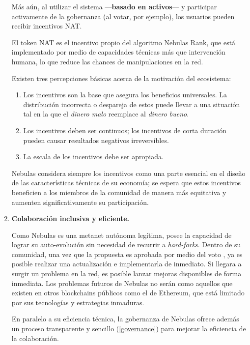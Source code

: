 \begin{enumerate}
	Más aún, al utilizar el sistema \nr —\textbf{basado en activos}— y participar activamente de la gobernanza \onchain (al votar, por ejemplo), los usuarios pueden recibir incentivos NAT.

	El token NAT es el incentivo propio del algoritmo Nebulas Rank, que está implementado por medio de capacidades técnicas más que intervención humana, lo que reduce las chances de manipulaciones en la red.

	Existen tres percepciones básicas acerca de la motivación del ecosistema:

	\begin{enumerate}
		\item Los incentivos son la base que asegura los beneficios universales. La distribución incorrecta o despareja de estos puede llevar a una situación tal en la que el \textit{dinero malo} reemplace al \textit{dinero bueno}.
		\item Los incentivos deben ser continuos; los incentivos de corta duración pueden causar resultados negativos irreversibles.
		\item La escala de los incentivos debe ser apropiada.
	\end{enumerate}

	Nebulas considera siempre los incentivos como una parte esencial en el diseño de las características técnicas de su economía; se espera que estos incentivos beneficien a los miembros de la comunidad de manera más equitativa y aumenten significativamente su participación.

	\item

	\textbf{Colaboración inclusiva y eficiente.}

	Como Nebulas es una metanet autónoma legítima, posee la capacidad de lograr su auto-evolución sin necesidad de recurrir a \textit{hard-forks}. Dentro de su comunidad, una vez que la propuesta es aprobada por medio del voto \onchain, ya es posible realizar una actualización e implementarla de inmediato. Si llegara a surgir un problema en la red, es posible lanzar mejoras disponibles de forma inmediata. Los problemas futuros de Nebulas no serán como aquellos que existen en otros blockchains públicos como el de Ethereum, que está limitado por sus tecnologías y estrategias inmaduras.

	En paralelo a su eficiencia técnica, la gobernanza de Nebulas ofrece además un proceso transparente y sencillo (\ref{governance}) para mejorar la eficiencia de la colaboración.

\end{enumerate}